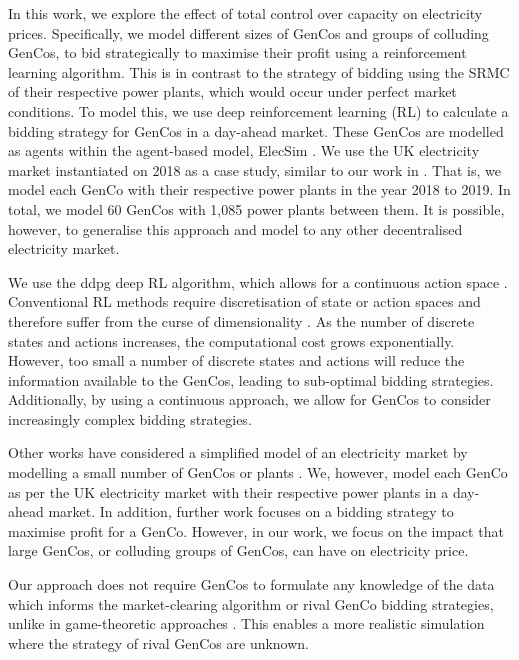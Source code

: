 In this work, we explore the effect of total control over capacity on electricity prices. Specifically, we model different sizes of GenCos and groups of colluding GenCos, to bid strategically to maximise their profit using a reinforcement learning algorithm. This is in contrast to the strategy of bidding using the SRMC of their respective power plants, which would occur under perfect market conditions. To model this, we use deep reinforcement learning (RL) to calculate a bidding strategy for GenCos in a day-ahead market. These GenCos are modelled as agents within the agent-based model, ElecSim \cite{Kell, Kell2020}. We use the UK electricity market instantiated on 2018 as a case study, similar to our work in \cite{Kell2019a}. That is, we model each GenCo with their respective power plants in the year 2018 to 2019. In total, we model 60 GenCos with 1,085 power plants between them. It is possible, however, to generalise this approach and model to any other decentralised electricity market. 

We use the \acrfull{ddpg} deep RL algorithm, which allows for a continuous action space \cite{Hunt2016a}. Conventional RL methods require discretisation of state or action spaces and therefore suffer from the curse of dimensionality \cite{Ye2020a}. As the number of discrete states and actions increases, the computational cost grows exponentially. However, too small a number of discrete states and actions will reduce the information available to the GenCos, leading to sub-optimal bidding strategies. Additionally, by using a continuous approach, we allow for GenCos to consider increasingly complex bidding strategies. 

Other works have considered a simplified model of an electricity market by modelling a small number of GenCos or plants \cite{EsmaeiliAliabadi2017,Tellidou2007}. We, however, model each GenCo as per the UK electricity market with their respective power plants in a day-ahead market. In addition, further work focuses on a bidding strategy to maximise profit for a GenCo. However, in our work, we focus on the impact that large GenCos, or colluding groups of GenCos, can have on electricity price.


Our approach does not require GenCos to formulate any knowledge of the data which informs the market-clearing algorithm or rival GenCo bidding strategies, unlike in game-theoretic approaches \cite{Wang2011}. This enables a more realistic simulation where the strategy of rival GenCos are unknown.





